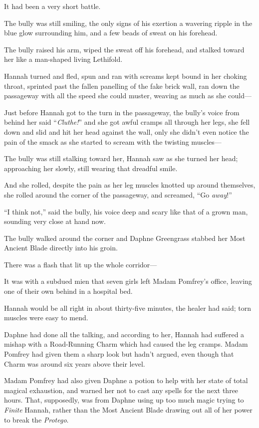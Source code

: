 It had been a very short battle.

The bully was still smiling, the only signs of his exertion a wavering ripple in the blue glow surrounding him, and a few beads of sweat on his forehead.

The bully raised his arm, wiped the sweat off his forehead, and stalked toward her like a man-shaped living Lethifold.

Hannah turned and fled, spun and ran with screams kept bound in her choking throat, sprinted past the fallen panelling of the fake brick wall, ran down the passageway with all the speed she could muster, weaving as much as she could—

Just before Hannah got to the turn in the passageway, the bully’s voice from behind her said “\emph{Cluthe!}” and she got awful cramps all through her legs, she fell down and slid and hit her head against the wall, only she didn’t even notice the pain of the smack as she started to scream with the twisting muscles—

The bully was still stalking toward her, Hannah saw as she turned her head; approaching her slowly, still wearing that dreadful smile.

And she rolled, despite the pain as her leg muscles knotted up around themselves, she rolled around the corner of the passageway, and screamed, “Go \emph{away}!”

“I think not,” said the bully, his voice deep and scary like that of a grown man, sounding very close at hand now.

The bully walked around the corner and Daphne Greengrass stabbed her Most Ancient Blade directly into his groin.

There was a flash that lit up the whole corridor—

\later

It was with a subdued mien that seven girls left Madam Pomfrey’s office, leaving one of their own behind in a hospital bed.

Hannah would be all right in about thirty-five minutes, the healer had said; torn muscles were easy to mend.

Daphne had done all the talking, and according to her, Hannah had suffered a mishap with a Road-Running Charm which had caused the leg cramps. Madam Pomfrey had given them a sharp look but hadn’t argued, even though that Charm was around six years above their level.

Madam Pomfrey had also given Daphne a potion to help with her state of total magical exhaustion, and warned her not to cast any spells for the next three hours. That, supposedly, was from Daphne using up too much magic trying to \emph{Finite} Hannah, rather than the Most Ancient Blade drawing out all of her power to break the \emph{Protego}.

